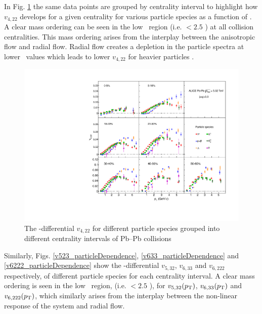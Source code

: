 \newpage

In Fig. \ref{v422_particleDependence} the same data points are grouped by centrality interval to highlight how $v_{4,22}$ develops for a given centrality for various particle species as a function of \pT.
A clear mass ordering can be seen in the low \pT~region (i.e. \pT $< 2.5$ \GeV) at all collision centralities. This mass ordering arises from the interplay between the anisotropic flow and radial flow. Radial flow creates a depletion in the particle spectra at lower \pT~values which leads to lower $v_{4,22}$ for heavier particles \cite{Voloshin:1996nv, Huovinen:2001cy, Shen:2011eg}.

\begin{figure}[!htb]
\begin{center}
\includegraphics[scale=0.82]{figures/results/All_v422_gap00_PID2_3by3.pdf}
\end{center}
\caption{The \pT-differential $v_{4,22}$ for different particle species grouped into different centrality intervals of Pb--Pb collisions \sNN}
\label{v422_particleDependence}
\end{figure}

Similarly, Figs. \ref{v523_particleDependence}, \ref{v633_particleDependence} and \ref{v6222_particleDependence} show the \pT-differential $v_{5,32}$, $v_{6,33}$ and $v_{6,222}$ respectively, of different particle species for each centrality interval. A clear mass ordering is seen in the low \pT~region, (i.e. \pT $< 2.5$ \GeV), for $v_{5,32}(p_{\rm{T}})$, $v_{6,33}(p_{\rm{T}})$ and $v_{6,222}(p_{\rm{T}})$, which similarly arises from the interplay between the non-linear response of the system and radial flow. 

